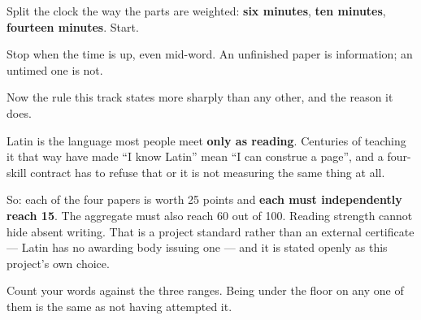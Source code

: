 Split the clock the way the parts are weighted: \textbf{six minutes}, \textbf{ten minutes}, \textbf{fourteen minutes}. Start.

Stop when the time is up, even mid-word. An unfinished paper is information; an untimed one is not.

\begin{tcolorbox}[breakable,colback=teal!4,colframe=teal!35!black,title={Before you move on}]
Now the rule this track states more sharply than any other, and the reason it does.

Latin is the language most people meet \textbf{only as reading}. Centuries of teaching it that way have made \textquotedblleft{}I know Latin\textquotedblright{} mean \textquotedblleft{}I can construe a page\textquotedblright{}, and a four-skill contract has to refuse that or it is not measuring the same thing at all.

So: each of the four papers is worth 25 points and \textbf{each must independently reach 15}. The aggregate must also reach 60 out of 100. Reading strength cannot hide absent writing. That is a project standard rather than an external certificate — Latin has no awarding body issuing one — and it is stated openly as this project's own choice.

Count your words against the three ranges. Being under the floor on any one of them is the same as not having attempted it.
\end{tcolorbox}
